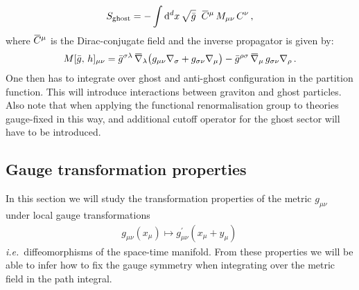 \documentclass[11pt]{book}
\newcommand{\overbar}[1]{\mkern 1.5mu\overline{\mkern-1.5mu#1\mkern-1.5mu}\mkern 1.5mu}
\newcommand{\bnabla}{\overbar \nabla}
\newcommand\ie{\textit{i.e.}\ }
\numberwithin{equation}{chapter}
\begin{document}
\begin{appendices}
\begin{align}
  S_{\mathrm{ghost}} = - \int \mathrm{d}^dx \, \sqrt{\bar{g}} \;\;
  \overbar{C}^{\mu} \, M_{\mu\nu} \, C^{\nu} \,,
\end{align}
where $\overbar{C}^{\mu}$ is the Dirac-conjugate field and the inverse propagator is given by:
\begin{align}
  M[\bar g, \, h ]_{\mu\nu} = \bar{g}^{\sigma\lambda} \, \bnabla_\lambda
  \big(
    g_{\mu\nu}     \nabla_{\sigma}
    + g_{\sigma\nu} \nabla_{\mu}
  \big)
  - \bar{g}^{\rho\sigma} \, \bnabla_\mu \, g_{\sigma\nu} \nabla_{\rho} \,.
\end{align}
One then has to integrate over ghost and anti-ghost configuration in the partition function.
This will introduce interactions between graviton and ghost particles.
Also note that when applying the functional renormalisation group to theories
gauge-fixed in this way, and additional cutoff operator for the ghost sector will have to be
introduced.


\subsection{Gauge transformation properties}

In this section we will study the transformation properties
of the metric $g_{\mu\nu}$ under local gauge transformations
\begin{align}
  g_{\mu\nu}(x_\mu) \mapsto g^\prime_{\mu\nu}(x_\mu+y_\mu) \,
\end{align}
\ie diffeomorphisms of the space-time manifold.
From these properties we will be able to infer how to fix
the gauge symmetry when integrating
over the metric field in the path integral.


\end{appendices}
\end{document}
